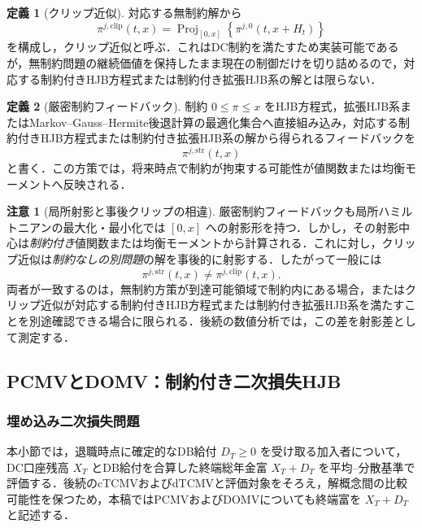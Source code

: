 \documentclass[10pt,a4paper]{article}
\theoremstyle{plain}
\theoremstyle{definition}
\newtheorem{definition}{定義}
\newtheorem{remark}{注意}
\DeclareMathOperator{\Proj}{Proj}
\begin{document}
\begin{definition}[クリップ近似]
対応する無制約解から
\begin{equation}
  \pi^{j,\mathrm{clip}}(t,x)
  =\Proj_{[0,x]}\!\left\{\pi^{j,0}(t,x+H_t)\right\}
  \label{eq:クリップ-def}
\end{equation}
を構成し，クリップ近似と呼ぶ．これはDC制約を満たすため実装可能であるが，無制約問題の継続価値を保持したまま現在の制御だけを切り詰めるので，対応する制約付きHJB方程式または制約付き拡張HJB系の解とは限らない．
\end{definition}

\begin{definition}[厳密制約フィードバック]
制約 $0\leq\pi\leq x$ をHJB方程式，拡張HJB系またはMarkov--Gauss--Hermite後退計算の最適化集合へ直接組み込み，対応する制約付きHJB方程式または制約付き拡張HJB系の解から得られるフィードバックを
\[
  \pi^{j,\mathrm{str}}(t,x)
\]
と書く．この方策では，将来時点で制約が拘束する可能性が値関数または均衡モーメントへ反映される．
\end{definition}

\begin{remark}[局所射影と事後クリップの相違]
厳密制約フィードバックも局所ハミルトニアンの最大化・最小化では $[0,x]$ への射影形を持つ．しかし，その射影中心は\emph{制約付き}値関数または均衡モーメントから計算される．これに対し，クリップ近似は\emph{制約なしの別問題}の解を事後的に射影する．したがって一般には
\[
  \pi^{j,\mathrm{str}}(t,x)\neq\pi^{j,\mathrm{clip}}(t,x).
\]
両者が一致するのは，無制約方策が到達可能領域で制約内にある場合，またはクリップ近似が対応する制約付きHJB方程式または制約付き拡張HJB系を満たすことを別途確認できる場合に限られる．後続の数値分析では，この差を射影差として測定する．
\end{remark}

\subsection{PCMVとDOMV：制約付き二次損失HJB}
\label{sec:pcmv-domv}

\subsubsection{埋め込み二次損失問題}

本小節では，退職時点に確定的なDB給付 $D_T\geq0$ を受け取る加入者について，DC口座残高 $X_T$ とDB給付を合算した終端総年金富 $X_T+D_T$ を平均--分散基準で評価する．後続のcTCMVおよびdTCMVと評価対象をそろえ，解概念間の比較可能性を保つため，本稿ではPCMVおよびDOMVについても終端富を $X_T+D_T$ と記述する．
\end{document}
